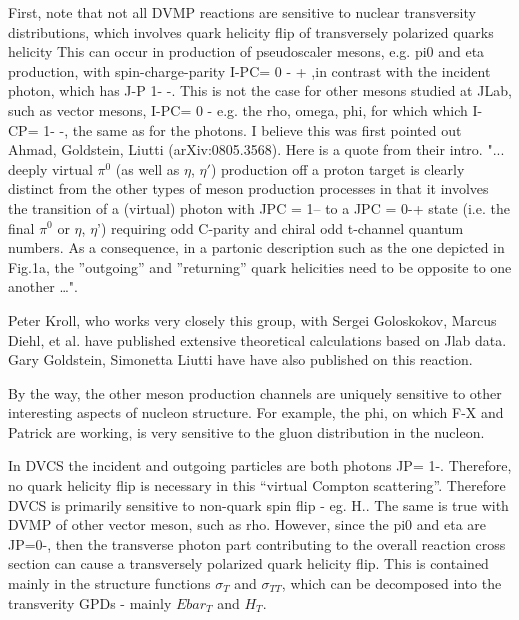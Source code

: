         First, note that not all DVMP reactions are sensitive to nuclear transversity distributions, which involves quark helicity flip of transversely polarized quarks helicity  This can occur in  production of pseudoscaler mesons,  e.g. pi0 and eta production, with spin-charge-parity  I-PC= 0 - + ,in contrast with  the incident photon, which  has J-P 1- -. This is not the case for other mesons studied at JLab, such as vector mesons, I-PC= 0 - e.g. the rho, omega, phi, for which which I-CP= 1- -, the same as for the photons.   I believe this was first  pointed out  Ahmad, Goldstein, Liutti (arXiv:0805.3568). Here is a quote from their intro.
        "... deeply virtual $\pi^0$ (as well as $\eta$, $\eta'$) production off a proton target is clearly distinct from the other types of meson production processes in that it involves the transition of a (virtual) photon with JPC = 1-- to a JPC = 0-+ state (i.e. the final $\pi^0$ or $\eta$, $\eta$') requiring odd C-parity and chiral odd t-channel quantum numbers. As a consequence, in a partonic description such as the one depicted in Fig.1a, the ”outgoing” and ”returning” quark helicities need to be opposite to one another …". 
        
        Peter Kroll, who works very closely this group, with Sergei Goloskokov, Marcus Diehl, et al. have published extensive theoretical calculations based on Jlab data.   Gary Goldstein, Simonetta Liutti have have also published on this  reaction.
        
        By the way, the other meson production channels  are uniquely sensitive to other  interesting aspects of nucleon structure. For example, the phi, on which F-X and Patrick are working, is very sensitive to the gluon distribution in the nucleon.
        
        In DVCS the  incident and  outgoing particles are both photons JP= 1-. Therefore, no quark helicity flip is necessary in this “virtual Compton scattering”.  Therefore DVCS is primarily sensitive to non-quark spin flip - eg. H.. The same is true with DVMP of other vector meson, such as rho.  
    	However,  since the pi0 and eta are JP=0-, then the transverse photon part contributing to the overall reaction cross section can cause a transversely polarized  quark helicity flip. This is contained mainly  in the structure functions $\sigma_T$ and $\sigma_{TT}$, which can be decomposed into the transverity GPDs - mainly $Ebar_T$ and $H_T$. 
    	
